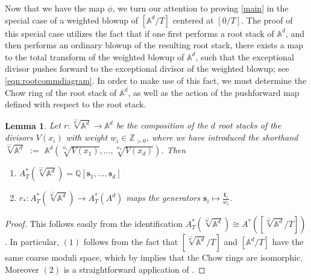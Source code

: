 \documentclass[11pt,oneside,english]{article}
\numberwithin{equation}{section}
\newtheorem{lemma}[theorem]{Lemma}
\theoremstyle{definition}
\newcommand{\ra}{\rightarrow}
\newcommand\A{\mathbb{A}}
\begin{document}
Now that we have the map $\phi$, we turn our attention to proving \cref{main} in the special case of a weighted blowup of $[\A^d/T]$ centered at $[0/T]$. The proof of this special case utilizes the fact that if one first performs a root stack of $\mathbb A^d$, and then performs an ordinary blowup of the resulting root stack, there exists a map to the total transform of the weighted blowup of $\mathbb A^d$, such that the exceptional divisor pushes forward to the exceptional divisor of the weighted blowup; see \cref{eqn:rootcommdiagram}. In order to make use of this fact, we must determine the Chow ring of the root stack of $\mathbb A^d$, as well as the action of the pushforward map defined with respect to the root stack. 


\begin{lemma} \label{chow ring of the root stack}
     Let $ r:\sqrt[\vec w]{\mathbb A^d}  \ra \A^d$ be the composition of the $d$ root stacks of the divisors $V(x_i)$ with weight $w_i \in \mathbb Z_{>0}$, where we have introduced the shorthand $\sqrt[\vec w]{\mathbb A^d}$ $:=$ $\A^d(\sqrt[w_1]{V(x_1)},...,\sqrt[w_d]{V(x_d)})$. Then
    \begin{enumerate}
        \item $A^*_T(\sqrt[\vec w]{\mathbb A^d})=\mathbb Q[\boldsymbol s_1,...,\boldsymbol s_d]$
        \item $r_*: A^*_T(\sqrt[\vec w]{\mathbb A^d}) \ra A^*_T(A^d)$ maps the generators $\boldsymbol s_i \mapsto \frac{\boldsymbol t_i}{w_i}$.
    \end{enumerate}
\end{lemma}

\begin{proof}
    This follows easily from the identification $A^*_T(\sqrt[\vec w]{\mathbb A^d})\cong A^*([\sqrt[\vec w]{\mathbb A^d}/T])$. In particular, $(1)$ follows from the fact that $[\sqrt[\vec w]{\mathbb A^d}/T]$ and $[\A^d/T]$ have the same coarse moduli space, which by \cite[Proposition 6.1]{Vistoli:1989aa} implies that the Chow rings are isomorphic. Moreover $(2)$ is a straightforward application of \cite[Definition 3.6]{Vistoli:1989aa}.
 \end{proof}
\end{document}
